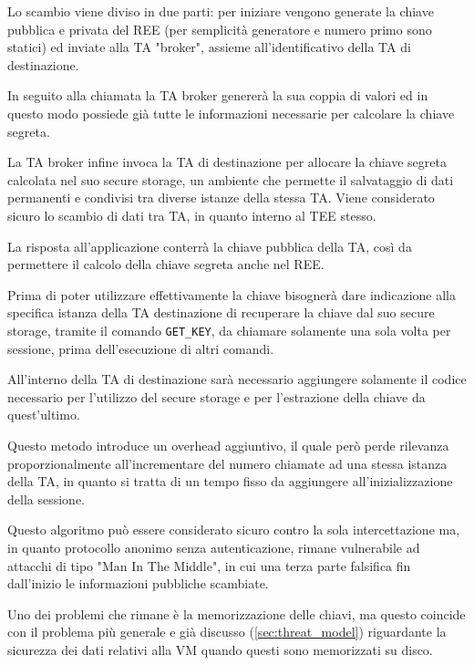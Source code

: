 \documentclass[12pt,italian]{report}
\begin{document}
	\bigbreak
	
	Lo scambio viene diviso in due parti: per iniziare vengono generate la chiave pubblica e privata del REE (per semplicità generatore e numero primo sono statici) ed inviate alla TA "broker", assieme all'identificativo della TA di destinazione.
	
	In seguito alla chiamata la TA broker genererà la sua coppia di valori ed in questo modo possiede già tutte le informazioni necessarie per calcolare la chiave segreta. 
	
	La TA broker infine invoca la TA di destinazione per allocare la chiave segreta calcolata nel suo secure storage, un ambiente che permette il salvataggio di dati permanenti e condivisi tra diverse istanze della stessa TA. Viene considerato sicuro lo scambio di dati tra TA, in quanto interno al TEE stesso.
	
	La risposta all'applicazione conterrà la chiave pubblica della TA, così da permettere il calcolo della chiave segreta anche nel REE.
	
	Prima di poter utilizzare effettivamente la chiave bisognerà dare indicazione alla specifica istanza della TA destinazione di recuperare la chiave dal suo secure storage, tramite il comando \texttt{GET\_KEY}, da chiamare solamente una sola volta per sessione, prima dell'esecuzione di altri comandi.
	
	\bigbreak 
	
	All'interno della TA di destinazione sarà necessario aggiungere solamente il codice necessario per l'utilizzo del secure storage e per l'estrazione della chiave da quest'ultimo.
	
	\bigbreak
	
	Questo metodo introduce un overhead aggiuntivo, il quale però perde rilevanza proporzionalmente all'incrementare del numero chiamate ad una stessa istanza della TA, in quanto si tratta di un tempo fisso da aggiungere all'inizializzazione della sessione. 
	
	\bigbreak
	
	Questo algoritmo può essere considerato sicuro contro la sola intercettazione ma, in quanto protocollo anonimo senza autenticazione, rimane vulnerabile ad attacchi di tipo "Man In The Middle", in cui una terza parte falsifica fin dall'inizio le informazioni pubbliche scambiate.
	
	\bigbreak
	
	Uno dei problemi che rimane è la memorizzazione delle chiavi, ma questo coincide con il problema più generale e già discusso (\ref{sec:threat_model}) riguardante la sicurezza dei dati relativi alla VM quando questi sono memorizzati su disco.
	
\end{document}
